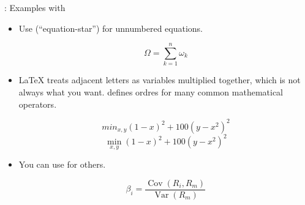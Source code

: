 \begin{frame}[fragile]{\insertsubsection{}: Examples with }
\begin{itemize}
\item Use  (``equation-star'') for unnumbered equations.
\begin{exampletwouptiny}
\begin{equation*}
  \Omega = \sum_{k=1}^{n} \omega_k
\end{equation*}
\end{exampletwouptiny}
\item \LaTeX{} treats adjacent letters as variables multiplied together, which
is not always what you want.  defines ordres for many common
mathematical operators.
\begin{exampletwouptiny}
\begin{equation*} %
 min_{x,y} (1-x)^2 + 100(y-x^2)^2
\end{equation*}
\begin{equation*} %
\min_{x,y}{(1-x)^2 + 100(y-x^2)^2}
\end{equation*}
\end{exampletwouptiny}
\item You can use  for others.
\begin{exampletwouptiny}
\begin{equation*}
\beta_i =
\frac{\operatorname{Cov}(R_i, R_m)}
     {\operatorname{Var}(R_m)}
\end{equation*}
\end{exampletwouptiny}
\end{itemize}
\end{frame}

